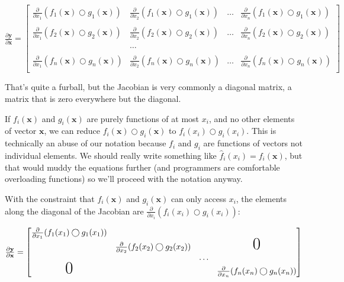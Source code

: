\documentclass[11pt]{article}
\begin{document}
$
\frac{\partial \mathbf{y}}{\partial \mathbf{x}}  = \begin{bmatrix}
\frac{\partial}{\partial x_1} ( f_{1}(\mathbf{x}) \bigcirc g_{1}(\mathbf{x}) ) & \frac{\partial}{\partial x_2} ( f_{1}(\mathbf{x}) \bigcirc g_{1}(\mathbf{x}) ) & \ldots & \frac{\partial}{\partial x_n} ( f_{1}(\mathbf{x}) \bigcirc g_{1}(\mathbf{x}) )\\\\
\frac{\partial}{\partial x_1} ( f_{2}(\mathbf{x}) \bigcirc g_{2}(\mathbf{x}) ) & \frac{\partial}{\partial x_2} ( f_{2}(\mathbf{x}) \bigcirc g_{2}(\mathbf{x}) ) & \ldots & \frac{\partial}{\partial x_n} ( f_{2}(\mathbf{x}) \bigcirc g_{2}(\mathbf{x}) )\\\\
& \ldots\\\\
\frac{\partial}{\partial x_1} ( f_{n}(\mathbf{x}) \bigcirc g_{n}(\mathbf{x}) ) & \frac{\partial}{\partial x_2} ( f_{n}(\mathbf{x}) \bigcirc g_{n}(\mathbf{x}) ) & \ldots & \frac{\partial}{\partial x_n} ( f_{n}(\mathbf{x}) \bigcirc g_{n}(\mathbf{x}) )\\
\end{bmatrix}
$

That's quite a furball, but the Jacobian is very commonly a diagonal matrix, a matrix that is zero everywhere but the diagonal. 

If $f_i(\mathbf{x})$ and $g_i(\mathbf{x})$ are purely functions of at most $x_i$, and no other elements of vector $\mathbf{x}$, we can reduce $f_i(\mathbf{x}) \bigcirc g_i(\mathbf{x})$ to $f_i(x_i) \bigcirc g_i(x_i)$. This is technically an abuse of our notation because $f_i$ and $g_i$ are functions of vectors not individual elements. We should really write something like $\hat f_{i}(x_i) = f_{i}(\mathbf{x})$, but that would muddy the equations further (and programmers are comfortable overloading functions) so we'll proceed with the notation anyway.

With the constraint that $f_i(\mathbf{x})$ and $g_i(\mathbf{x})$ can only access $x_i$, the elements along the diagonal of the Jacobian are $\frac{\partial}{\partial x_i} ( f_i(x_i) \bigcirc g_i(x_i) )$:

$
\frac{\partial \mathbf{y}}{\partial \mathbf{x}}  = \begin{bmatrix}
\frac{\partial}{\partial x_1} ( f_{1}(x_1) \bigcirc g_{1}(x_1) )\\
& \frac{\partial}{\partial x_2} (f_{2}(x_2) \bigcirc g_{2}(x_2) ) & &\text{\huge0}\\
& & \ldots \\
\text{\huge0}& & & \frac{\partial}{\partial x_n} (f_{n}(x_n) \bigcirc g_{n}(x_n) )
\end{bmatrix}
$
\end{document}
